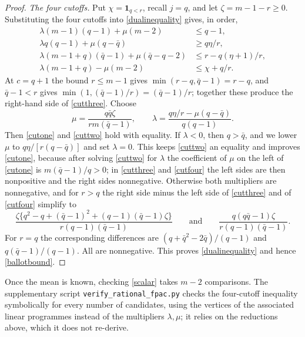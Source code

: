 \documentclass[11pt,a4paper]{article}
\theoremstyle{definition}
\theoremstyle{remark}
\newcommand{\one}{\mathbf 1}
\begin{document}
\begin{proof}
\emph{The four cutoffs.} Put $\chi=\one_{q<r}$, recall $j=q$, and let $\zeta=m-1-r\ge0$. Substituting the four cutoffs into \eqref{dualinequality} gives, in order,
\begin{align}
 \lambda(m-1)(q-1)+\mu(m-2)&\le q-1,\label{cutone}\\
 \lambda q(q-1)+\mu(q-\bar q)&\ge q\eta/r,\label{cuttwo}\\
 \lambda(m-1+q)(\bar q-1)+\mu(\bar q-q-2)&\le r-q(\eta+1)/r,\label{cutthree}\\
 \lambda(m-1+q)-\mu(m-2)&\le \chi+q/r.\label{cutfour}
\end{align}
At $c=q+1$ the bound $r\le m-1$ gives $\min(r-q,\bar q-1)=r-q$, and $\bar q-1<r$ gives $\min(1,(\bar q-1)/r)=(\bar q-1)/r$; together these produce the right-hand side of \eqref{cutthree}. Choose
\[
 \mu=\frac{q\bar q\zeta}{rm(\bar q-1)},\qquad \lambda=\frac{q\eta/r-\mu(q-\bar q)}{q(q-1)}.
\]
Then \eqref{cutone} and \eqref{cuttwo} hold with equality. If $\lambda<0$, then $q>\bar q$, and we lower $\mu$ to $q\eta/[r(q-\bar q)]$ and set $\lambda=0$. This keeps \eqref{cuttwo} an equality and improves \eqref{cutone}, because after solving \eqref{cuttwo} for $\lambda$ the coefficient of $\mu$ on the left of \eqref{cutone} is $m(\bar q-1)/q>0$; in \eqref{cutthree} and \eqref{cutfour} the left sides are then nonpositive and the right sides nonnegative. Otherwise both multipliers are nonnegative, and for $r>q$ the right side minus the left side of \eqref{cutthree} and of \eqref{cutfour} simplify to
\[
 \frac{\zeta\{q^2-q+(\bar q-1)^2+(q-1)(\bar q-1)\zeta\}}{r(q-1)(\bar q-1)}
 \qquad\text{and}\qquad
 \frac{q(q\bar q-1)\zeta}{r(q-1)(\bar q-1)} .
\]
For $r=q$ the corresponding differences are $(q+\bar q^2-2\bar q)/(q-1)$ and $q(\bar q-1)/(q-1)$. All are nonnegative. This proves \eqref{dualinequality} and hence \eqref{ballotbound}.
\end{proof}

Once the mean is known, checking \eqref{scalar} takes $m-2$ comparisons. The supplementary script \texttt{verify\_rational\_fpac.py} checks the four-cutoff inequality symbolically for every number of candidates, using the vertices of the associated linear programmes instead of the multipliers $\lambda,\mu$; it relies on the reductions above, which it does not re-derive.
\end{document}
